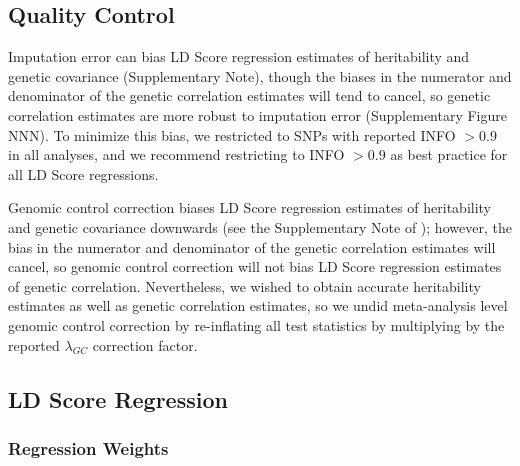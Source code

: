 \documentclass[11pt]{article}
\begin{document}
\subsection{Quality Control}

Imputation error can bias LD Score regression estimates of heritability and genetic covariance (Supplementary Note), though the biases in the numerator and denominator of the genetic correlation estimates will tend to cancel, so genetic correlation estimates are more robust to imputation error (Supplementary Figure NNN). To minimize this bias, we restricted to SNPs with reported INFO $> 0.9$ in all analyses, and we recommend restricting to INFO $>0.9$ as best practice for all LD Score regressions.

Genomic control correction biases LD Score regression estimates of heritability and genetic covariance downwards
(see the Supplementary Note of \cite{buliksullivan2014});
however, the bias in the numerator and denominator of the genetic correlation estimates will cancel, 
so genomic control correction will not bias LD Score regression estimates of genetic correlation.
Nevertheless, we wished to obtain accurate heritability estimates as well as genetic correlation estimates,
so we undid meta-analysis level genomic control correction by re-inflating all test statistics by multiplying by the reported 
$\lambda_{GC}$ correction factor.

\subsection{LD Score Regression}

\subsubsection{Regression Weights} 
\end{document}
